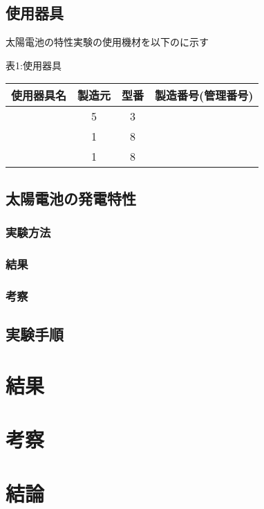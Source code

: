\subsection{使用器具}
太陽電池の特性実験の使用機材を以下のに示す
	\begin{table}[hbpt]
		\centering
		 表1:使用器具\\
			\begin{tabular}{|c||c|c|c|} \hline
			使用器具名 & 製造元 & 型番 & 製造番号(管理番号)\\ \hline
			 & 5 & 3 & \\ \hline
			 & 1 & 8 & \\ \hline
			 & 1 & 8 & \\ \hline
			\end{tabular}

	\end{table}

\subsection{太陽電池の発電特性}
\subsubsection{実験方法}
\subsubsection{結果}
\subsubsection{考察}


\subsection{実験手順}


\section{結果}
\section{考察}
\section{結論}